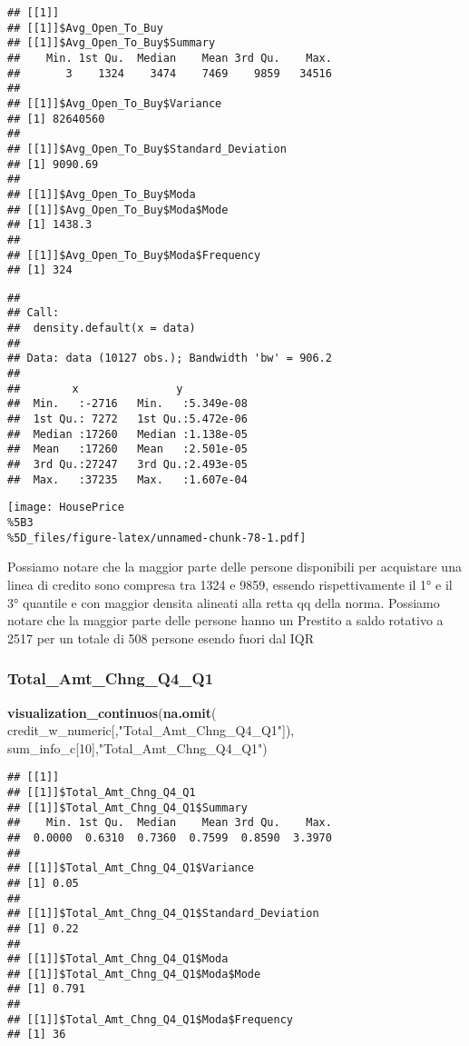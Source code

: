 \documentclass[
]{article}
\newenvironment{Shaded}{\begin{snugshade}}{\end{snugshade}}
\newcommand{\DecValTok}[1]{\textcolor[rgb]{0.00,0.00,0.81}{#1}}
\newcommand{\FunctionTok}[1]{\textcolor[rgb]{0.13,0.29,0.53}{\textbf{#1}}}
\newcommand{\NormalTok}[1]{#1}
\newcommand{\StringTok}[1]{\textcolor[rgb]{0.31,0.60,0.02}{#1}}
\begin{document}
\begin{verbatim}
## [[1]]
## [[1]]$Avg_Open_To_Buy
## [[1]]$Avg_Open_To_Buy$Summary
##    Min. 1st Qu.  Median    Mean 3rd Qu.    Max. 
##       3    1324    3474    7469    9859   34516 
## 
## [[1]]$Avg_Open_To_Buy$Variance
## [1] 82640560
## 
## [[1]]$Avg_Open_To_Buy$Standard_Deviation
## [1] 9090.69
## 
## [[1]]$Avg_Open_To_Buy$Moda
## [[1]]$Avg_Open_To_Buy$Moda$Mode
## [1] 1438.3
## 
## [[1]]$Avg_Open_To_Buy$Moda$Frequency
## [1] 324
\end{verbatim}

\begin{verbatim}
## 
## Call:
##  density.default(x = data)
## 
## Data: data (10127 obs.); Bandwidth 'bw' = 906.2
## 
##        x               y            
##  Min.   :-2716   Min.   :5.349e-08  
##  1st Qu.: 7272   1st Qu.:5.472e-06  
##  Median :17260   Median :1.138e-05  
##  Mean   :17260   Mean   :2.501e-05  
##  3rd Qu.:27247   3rd Qu.:2.493e-05  
##  Max.   :37235   Max.   :1.607e-04
\end{verbatim}

\texttt{[image: HousePrice\\\%5B3\\\%5D\_files/figure-latex/unnamed-chunk-78-1.pdf]}

Possiamo notare che la maggior parte delle persone disponibili per
acquistare una linea di credito sono compresa tra 1324 e 9859, essendo
rispettivamente il 1° e il 3° quantile e con maggior densita alineati
alla retta qq della norma. Possiamo notare che la maggior parte delle
persone hanno un Prestito a saldo rotativo a 2517 per un totale di 508
persone esendo fuori dal IQR

\subsubsection{Total\_Amt\_Chng\_Q4\_Q1}\label{total_amt_chng_q4_q1}

\begin{Shaded}
\begin{Highlighting}[]
\FunctionTok{visualization\_continuos}\NormalTok{(}\FunctionTok{na.omit}\NormalTok{(}
\NormalTok{  credit\_w\_numeric[,}\StringTok{"Total\_Amt\_Chng\_Q4\_Q1"}\NormalTok{]), sum\_info\_c[}\DecValTok{10}\NormalTok{],}\StringTok{"Total\_Amt\_Chng\_Q4\_Q1"}\NormalTok{)}
\end{Highlighting}
\end{Shaded}

\begin{verbatim}
## [[1]]
## [[1]]$Total_Amt_Chng_Q4_Q1
## [[1]]$Total_Amt_Chng_Q4_Q1$Summary
##    Min. 1st Qu.  Median    Mean 3rd Qu.    Max. 
##  0.0000  0.6310  0.7360  0.7599  0.8590  3.3970 
## 
## [[1]]$Total_Amt_Chng_Q4_Q1$Variance
## [1] 0.05
## 
## [[1]]$Total_Amt_Chng_Q4_Q1$Standard_Deviation
## [1] 0.22
## 
## [[1]]$Total_Amt_Chng_Q4_Q1$Moda
## [[1]]$Total_Amt_Chng_Q4_Q1$Moda$Mode
## [1] 0.791
## 
## [[1]]$Total_Amt_Chng_Q4_Q1$Moda$Frequency
## [1] 36
\end{verbatim}
\end{document}
